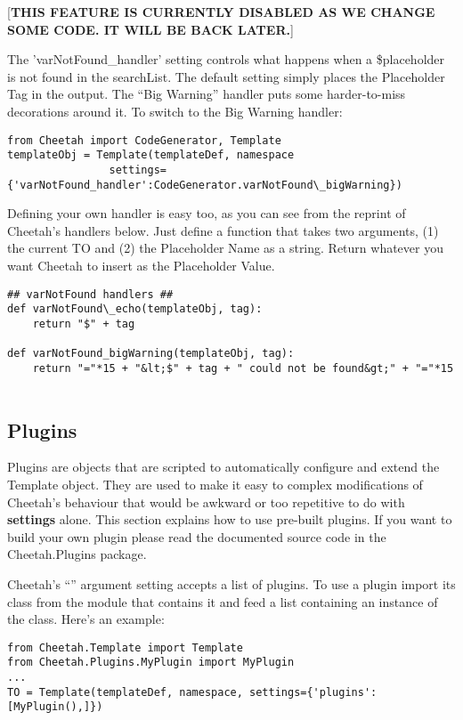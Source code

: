 [{\bf THIS FEATURE IS CURRENTLY DISABLED AS WE CHANGE SOME CODE.  IT WILL BE
  BACK LATER.}]

The 'varNotFound\_handler' setting controls what happens when a \$placeholder
is not found in the searchList.  The default setting simply places the
Placeholder Tag in the output.  The ``Big Warning'' handler puts some
harder-to-miss decorations around it.  To switch to the Big Warning handler:

\begin{verbatim}
from Cheetah import CodeGenerator, Template
templateObj = Template(templateDef, namespace
                settings={'varNotFound_handler':CodeGenerator.varNotFound\_bigWarning})
\end{verbatim}

Defining your own handler is easy too, as you can see from the reprint of
Cheetah's handlers below.  Just define a function that takes two arguments, 
(1) the current TO and (2) the Placeholder Name as a string.  Return whatever
you want Cheetah to insert as the Placeholder Value.

\begin{verbatim}
## varNotFound handlers ##
def varNotFound\_echo(templateObj, tag):
    return "$" + tag

def varNotFound_bigWarning(templateObj, tag):
    return "="*15 + "&lt;$" + tag + " could not be found&gt;" + "="*15
    
\end{verbatim}

\subsection{Plugins}

Plugins are objects that are scripted to automatically configure and extend the
Template object.  They are used to make it easy to complex modifications of
Cheetah's behaviour that would be awkward or too repetitive to do with {\bf
  settings} alone. This section explains how to use pre-built plugins. If you
want to build your own plugin please read the documented source code in the
Cheetah.Plugins package.

Cheetah's ``'' argument setting accepts a list of plugins. To use
a plugin import its class from the module that contains it and feed
 a list containing an instance of the class. Here's an example:

\begin{verbatim}
from Cheetah.Template import Template
from Cheetah.Plugins.MyPlugin import MyPlugin
...
TO = Template(templateDef, namespace, settings={'plugins':[MyPlugin(),]})
\end{verbatim}


